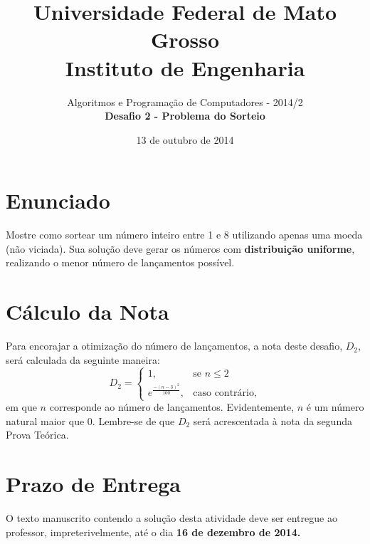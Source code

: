 \documentclass[12pt]{article}
\begin{document}
 
 
\title{Universidade Federal de Mato Grosso\\
Instituto de Engenharia}




\author{Algoritmos e Programa\c{c}\~ao de Computadores - 2014/2 \\
{\bf Desafio 2 - Problema do Sorteio}} %
\date{13 de outubro de 2014}
\maketitle


\section{Enunciado}
Mostre como sortear um n\'umero inteiro entre 1 e 8 utilizando apenas uma moeda (n\~ao viciada). Sua solu\c{c}\~ao deve gerar os n\'umeros com {\bf distribui\c{c}\~ao uniforme}, realizando o menor n\'umero de lan\c{c}amentos poss\'ivel. 


\section{C\'alculo da Nota}
Para encorajar a otimiza\c{c}\~ao do n\'umero de lan\c{c}amentos, a nota deste desafio, $D_2$, ser\'a calculada da seguinte maneira:
\begin{equation}
D_2 = \begin{cases} 1, & \mbox{se } n \leq 2 \\ e^{\frac{-(n-3)^2}{100}}, & \mbox{caso contr\'ario,}  \end{cases}%
\end{equation}
em que $n$ corresponde ao n\'umero de lan\c{c}amentos. Evidentemente, $n$ \'e um n\'umero natural maior que $0$. Lembre-se de que $D_2$ ser\'a acrescentada \`a nota da segunda Prova Te\'orica.

\section{Prazo de Entrega}

O texto manuscrito contendo a solu\c{c}\~ao desta atividade deve ser entregue ao professor, impreteri\-vel\-mente, at\'e o dia {\bf 16 de dezembro de 2014.}
\end{document}
